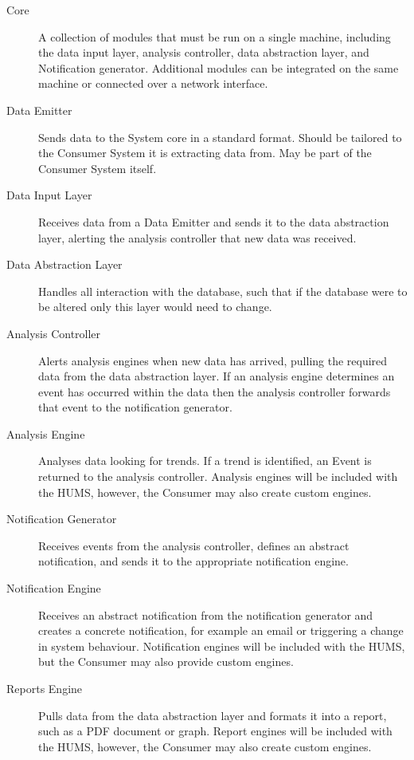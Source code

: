 \documentclass[10pt,a4paper]{article}
\begin{document}
\begin{description}
  \item[Core] A collection of modules that must be run on a single machine, including the data input layer, analysis controller, data abstraction layer, and Notification generator. Additional modules can be integrated on the same machine or connected over a network interface.

  \item[Data Emitter] Sends data to the System core in a standard
    format. Should be tailored to the Consumer System it is extracting data
    from. May be part of the Consumer System itself.

  \item[Data Input Layer] Receives data from a Data Emitter and sends
    it to the data abstraction layer, alerting the analysis controller
    that new data was received.

  \item[Data Abstraction Layer] Handles all interaction with the
    database, such that if the database were to be altered only this
    layer would need to change.

  \item[Analysis Controller] Alerts analysis engines when new data
    has arrived, pulling the required data from the data abstraction
    layer. If an analysis engine determines an event has occurred
    within the data then the analysis controller forwards that event
    to the notification generator.

  \item[Analysis Engine] Analyses data looking for trends. If a
    trend is identified, an Event is returned to the analysis
    controller. Analysis engines will be included with the HUMS, however, the
    Consumer may also create custom engines.

  \item[Notification Generator] Receives events from the analysis
    controller, defines an abstract notification, and sends it to the
    appropriate notification engine.

  \item[Notification Engine] Receives an abstract notification from
    the notification generator and creates a concrete notification,
    for example an email or triggering a change in system
    behaviour. Notification engines will be included with the HUMS, but the
    Consumer may also provide custom engines.

  \item[Reports Engine] Pulls data from the data abstraction layer and
    formats it into a report, such as a PDF document or graph. Report
    engines will be included with the HUMS, however, the Consumer may also create custom engines.
\end{description}
\end{document}
